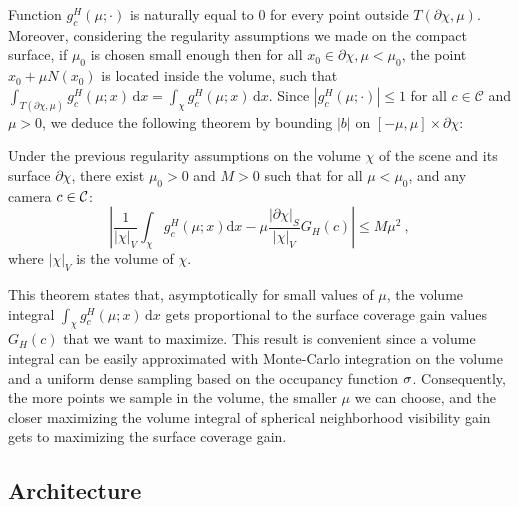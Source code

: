 Function $g_c^H(\mu;\cdot)$ is naturally equal to 0 for every point outside $T(\partial\chi, \mu)$. Moreover, considering the regularity assumptions we made on the compact surface, if $\mu_0$ is chosen small enough then for all $x_0\in \partial \chi, \mu < \mu_0$, the point $x_0 + \mu N(x_0)$ is located inside the volume, such that $\int_{T(\partial\chi, \mu)}  g_c^H(\mu;x)\,\text{d}x = \int_{\chi}  g_c^H(\mu;x)\,\text{d}x$. Since $|g_c^H(\mu;\cdot)|\leq 1$ for all $c\in\mathcal{C}$ and $\mu>0$, we deduce the following theorem by bounding $|b|$ on $[-\mu, \mu] \times \partial \chi$:
%
\begin{theorem}
    \label{thm:volumetric_approximation_of_coverage}
    Under the previous regularity assumptions on the volume $\chi$ of the scene and its surface $\partial\chi$, there exist $\mu_0 > 0$ and $M>0$ such that for all $\mu < \mu_0$, and any camera $c\in {\cal C}$:
    \begin{equation}
    \label{eqn:volumetric_approximation_of_coverage}
         \left| \frac{1}{|\chi|_V}\int_{\chi}  g_c^H(\mu;x) \text{d}x -  \mu \frac{|\partial\chi|_S}{|\chi|_V} G_H(c) \right| \leq M \mu^2 \> ,
    \end{equation}
    where $|\chi|_V$ is the volume of $\chi$.%
\end{theorem}

This theorem states that, asymptotically for small values of $\mu$, the volume integral $\int_\chi  g_c^H(\mu;x)\,\text{d}x$ gets proportional to the surface coverage gain values $G_H(c)$ that we want to maximize. This result is convenient since a volume integral can be easily approximated with Monte-Carlo integration on the volume and a uniform dense sampling based on the occupancy function $\sigma$. Consequently, the more points we sample in the volume, the smaller $\mu$ we can choose, and the closer maximizing the volume integral of spherical neighborhood visibility gain gets to maximizing the surface coverage gain.

\subsection{Architecture}


